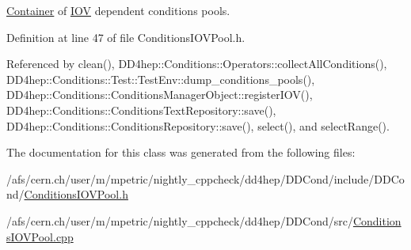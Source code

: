 \hyperlink{class_d_d4hep_1_1_conditions_1_1_container}{Container} of \hyperlink{class_d_d4hep_1_1_i_o_v}{I\+OV} dependent conditions pools. 



Definition at line 47 of file Conditions\+I\+O\+V\+Pool.\+h.



Referenced by clean(), D\+D4hep\+::\+Conditions\+::\+Operators\+::collect\+All\+Conditions(), D\+D4hep\+::\+Conditions\+::\+Test\+::\+Test\+Env\+::dump\+\_\+conditions\+\_\+pools(), D\+D4hep\+::\+Conditions\+::\+Conditions\+Manager\+Object\+::register\+I\+O\+V(), D\+D4hep\+::\+Conditions\+::\+Conditions\+Text\+Repository\+::save(), D\+D4hep\+::\+Conditions\+::\+Conditions\+Repository\+::save(), select(), and select\+Range().



The documentation for this class was generated from the following files\+:\begin{DoxyCompactItemize}
\item 
/afs/cern.\+ch/user/m/mpetric/nightly\+\_\+cppcheck/dd4hep/\+D\+D\+Cond/include/\+D\+D\+Cond/\hyperlink{_conditions_i_o_v_pool_8h}{Conditions\+I\+O\+V\+Pool.\+h}\item 
/afs/cern.\+ch/user/m/mpetric/nightly\+\_\+cppcheck/dd4hep/\+D\+D\+Cond/src/\hyperlink{_conditions_i_o_v_pool_8cpp}{Conditions\+I\+O\+V\+Pool.\+cpp}\end{DoxyCompactItemize}

